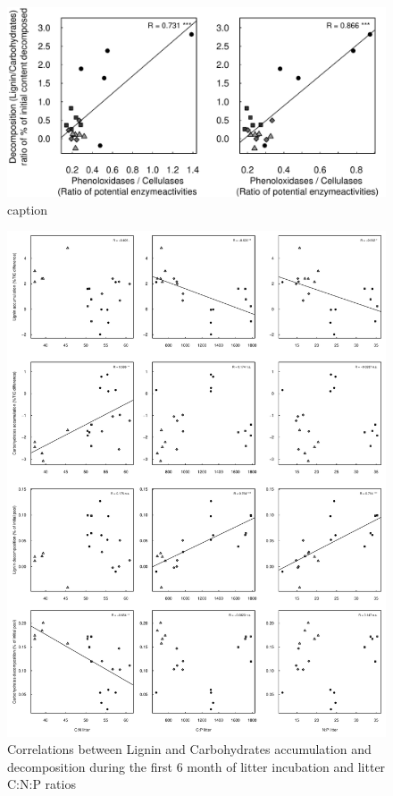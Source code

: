 \documentclass[10pt]{article}
\begin{document}
\newpage
\begin{figure}[h!]
\vspace*{2mm}
\begin{center}
\includegraphics{plosone-enzcorr}
\end{center}
\caption{caption}
\label{fig:enzcor}
\end{figure}


\newpage
\begin{figure}[h!]
\vspace*{2mm}
\begin{center}
\includegraphics{plosone-graphcorr2}
\end{center}
\caption{Correlations between Lignin and Carbohydrates accumulation and decomposition during the first 6 month of litter incubation and litter C:N:P ratios}
\label{fig:cor2}
\end{figure}
\end{document}

